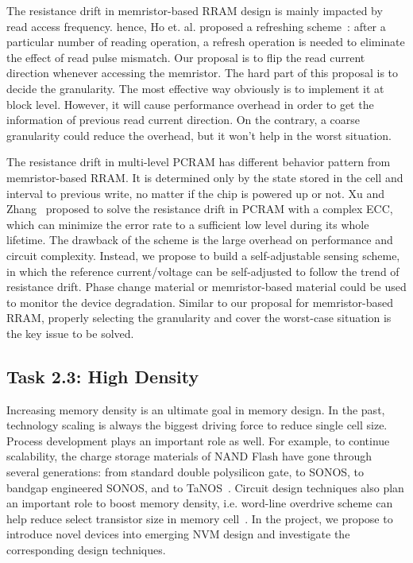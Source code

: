 The resistance drift in memristor-based RRAM design is mainly impacted by read access frequency. hence, Ho et. al. proposed a refreshing scheme~\cite{Ho09}: after a particular number of reading operation, a refresh operation is needed to eliminate the effect of read pulse mismatch. Our proposal is to flip the read current direction whenever accessing the memristor. The hard part of this proposal is to decide the granularity. The most effective way obviously is to implement it at block level. However, it will cause performance overhead in order to get the information of previous read current direction. On the contrary, a coarse granularity could reduce the overhead, but it won't help in the worst situation.

The resistance drift in multi-level PCRAM has different behavior pattern from memristor-based RRAM. It is determined only by the state stored in the cell and interval to previous write, no matter if the chip is powered up or not. Xu and Zhang~\cite{Xu10} proposed to solve the resistance drift in PCRAM with a complex ECC, which can minimize the error rate to a sufficient low level during its whole lifetime. The drawback of the scheme is the large overhead on performance and circuit complexity. Instead, we propose to build a self-adjustable sensing scheme, in which the reference current/voltage can be self-adjusted to follow the trend of resistance drift. Phase change material or memristor-based material could be used to monitor the device degradation. Similar to our proposal for memristor-based RRAM, properly selecting the granularity and cover the worst-case situation is the key issue to be solved.

\subsection{Task 2.3: High Density}
Increasing memory density is an ultimate goal in memory design. In the past, technology scaling is always the biggest driving force to reduce single cell size. Process development plays an important role as well. For example, to continue scalability, the charge storage materials of NAND Flash have gone through several generations: from standard double polysilicon gate, to SONOS, to bandgap engineered SONOS, and to TaNOS~\cite{Lu09}. Circuit design techniques also plan an important role to boost memory density, i.e. word-line overdrive scheme can help reduce select transistor size in memory cell~\cite{Li09}. In the project, we propose to introduce novel devices into emerging NVM design and investigate the corresponding design techniques.

